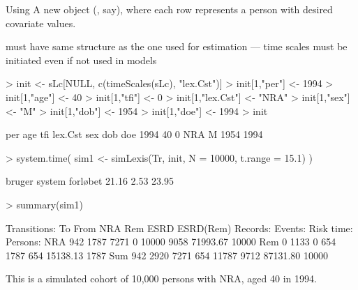 \begin{frame}{Using }
A new  object (, say), where each row
represents a person with desired covariate values.

 must have same structure as the one used for estimation --- time
scales must be initiated even if not used in models\\[-1ex]
\begin{Schunk}
\begin{Sinput}
> init <- sLc[NULL, c(timeScales(sLc), "lex.Cst")]
> init[1,"per"] <- 1994
> init[1,"age"] <- 40
> init[1,"tfi"] <- 0
> init[1,"lex.Cst"] <- "NRA"
> init[1,"sex"] <- "M"
> init[1,"dob"] <- 1954
> init[1,"doe"] <- 1994
> init
\end{Sinput}
\begin{Soutput}
  per age tfi lex.Cst sex  dob  doe
 1994  40   0     NRA   M 1954 1994
\end{Soutput}
\begin{Sinput}
> system.time( sim1 <- simLexis(Tr, init, N = 10000, t.range = 15.1) )
\end{Sinput}
\begin{Soutput}
  bruger   system forløbet 
   21.16     2.53    23.95 
\end{Soutput}
\begin{Sinput}
> summary(sim1)
\end{Sinput}
\begin{Soutput}
Transitions:
     To
From  NRA  Rem ESRD ESRD(Rem) Records: Events: Risk time: Persons:
  NRA 942 1787 7271         0    10000    9058   71993.67    10000
  Rem   0 1133    0       654     1787     654   15138.13     1787
  Sum 942 2920 7271       654    11787    9712   87131.80    10000
\end{Soutput}
\end{Schunk}
\pause
This is a simulated cohort of 10,000 persons with NRA, aged 40 in 1994.
\pause
\end{frame}


